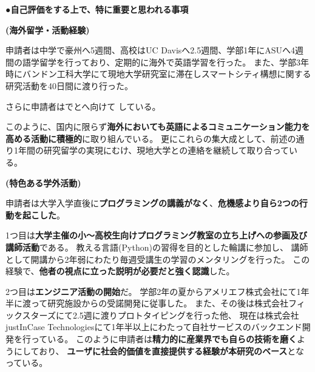 {\noindent
●\textbf{自己評価をする上で、特に重要と思われる事項}

%

\textbf{(海外留学・活動経験)}

申請者は中学で豪州へ5週間、高校はUC Davisへ2.5週間、学部1年にASUへ4週間の語学留学を行っており、定期的に海外で英語学習を行った。
また、学部3年時にバンドン工科大学にて現地大学研究室に滞在しスマートシティ構想に関する研究活動を40日間に渡り行った。

さらに申請者はでとへ向けて
している。

このように、国内に限らず\textbf{海外においても英語によるコミュニケーション能力を高める活動に積極的}に取り組んでいる。
更にこれらの集大成として、前述の通り1年間の研究留学の実現にむけ、現地大学との連絡を継続して取り合っている。

\textbf{(特色ある学外活動)}

申請者は大学入学直後に\textbf{プログラミングの講義がなく}、\textbf{危機感より自ら2つの行動を起こした}。

1つ目は\textbf{大学主催の小〜高校生向けプログラミング教室の立ち上げへの参画及び講師活動}\cite{uecprog}である。
教える言語(Python)の習得を目的とした輪講に参加し、
講師として開講から2年弱にわたり毎週受講生の学習のメンタリングを行った。
この経験で、\textbf{他者の視点に立った説明が必要だと強く認識}した。

2つ目は\textbf{エンジニア活動の開始}だ。
学部2年の夏からアメリエフ株式会社にて1年半に渡って研究施設からの受諾開発に従事した\cite{amelieff}。
また、その後は株式会社フィックスターズにて2.5週に渡りプロトタイピングを行った他、
現在は株式会社justInCase Technologiesにて1年半以上にわたって自社サービスのバックエンド開発を行っている\cite{jic-tech}。
このように申請者は\textbf{精力的に産業界でも自らの技術を磨く}ようにしており、
\textbf{ユーザに社会的価値を直接提供する経験が本研究のベース}となっている。

}
